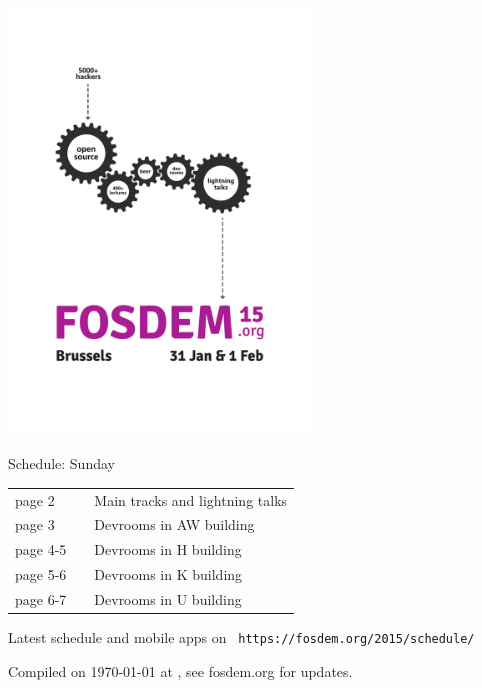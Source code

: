 \documentclass[a4paper,10pt]{article}
\begin{document}
\label{cover}
\begin{center}
\includegraphics[width=0.6\textwidth]{artwork/flyer_nobg}


{\fontsize{35}{45}\selectfont
\bf

Schedule: Sunday
}

\vfill

{\Large
\begin{tabular}{lll}
page 2   & &  Main tracks and lightning talks \\
page 3   & &  Devrooms in AW building \\
page 4-5 & &  Devrooms in H building \\
page 5-6 & &  Devrooms in K building \\
page 6-7 & &  Devrooms in U building \\
\end{tabular}

\vfill

Latest schedule and mobile apps on ~\texttt{https://fosdem.org/2015/schedule/}
}

\vfill

\end{center}

Compiled on {\ddmmyyyydate\today} at \currenttime, see fosdem.org for updates.


{%
\fontsize{10.5}{8.4}\selectfont%
\renewcommand{\arraystretch}{0.9}%
%
%
}
\end{document}
